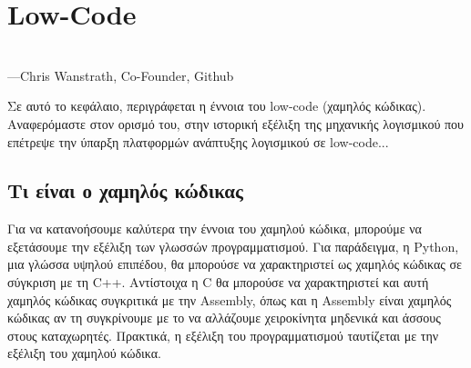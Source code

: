 \chapter{Low-Code}
    \begin{displayquote} \centering
         \\
        \hspace*{\fill}---Chris Wanstrath, Co-Founder, Github
    \end{displayquote}
    \vspace{1em}

    Σε αυτό το κεφάλαιο, περιγράφεται η έννοια του low-code (χαμηλός κώδικας). Αναφερόμαστε στον ορισμό του, στην ιστορική εξέλιξη της μηχανικής λογισμικού που επέτρεψε την ύπαρξη πλατφορμών ανάπτυξης λογισμικού σε low-code...


    \section{Τι είναι ο χαμηλός κώδικας}
        \begin{displayquote} \justifying
             \cite{Ibm_2024}
        \end{displayquote}

        Για να κατανοήσουμε καλύτερα την έννοια του χαμηλού κώδικα, μπορούμε να εξετάσουμε την εξέλιξη των γλωσσών προγραμματισμού. Για παράδειγμα, η Python, μια γλώσσα υψηλού επιπέδου, θα μπορούσε να χαρακτηριστεί ως χαμηλός κώδικας σε σύγκριση με τη C++. Αντίστοιχα η C θα μπορούσε να χαρακτηριστεί και αυτή χαμηλός κώδικας συγκριτικά με την Assembly, όπως και η Assembly είναι χαμηλός κώδικας αν τη συγκρίνουμε με το να αλλάζουμε χειροκίνητα μηδενικά και άσσους στους καταχωρητές. Πρακτικά, η εξέλιξη του προγραμματισμού ταυτίζεται με την εξέλιξη του χαμηλού κώδικα.


